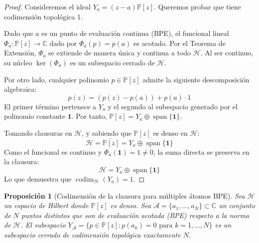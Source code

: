 \documentclass[12pt,a4paper]{article}
\newtheorem{proposition}{Proposición}
\theoremstyle{definition}
\theoremstyle{remark}
\newcommand{\Poly}{\mathbb{P}[z]}
\begin{document}
\begin{proof}
	Consideremos el ideal $Y_a = (z-a)\Poly$. Queremos probar que tiene codimensión topológica 1.

	Dado que $a$ es un punto de evaluación continua (BPE), el funcional lineal $\Phi_a: \Poly \to \mathbb{C}$ dado por $\Phi_a(p) = p(a)$ es acotado. Por el Teorema de Extensión, $\Phi_a$ se extiende de manera única y continua a todo $\mathcal{H}$. Al ser continuo, su núcleo $\ker(\Phi_a)$ es un subespacio cerrado de $\mathcal{H}$.

	Por otro lado, cualquier polinomio $p \in \Poly$ admite la siguiente descomposición algebraica:
	$$p(z) = (p(z) - p(a)) + p(a) \cdot 1$$
	El primer término pertenece a $Y_a$ y el segundo al subespacio generado por el polinomio constante $\mathbf{1}$. Por tanto, $\Poly = Y_a \oplus \operatorname{span}\{\mathbf{1}\}$.

	Tomando clausuras en $\mathcal{H}$, y sabiendo que $\Poly$ es denso en $\mathcal{H}$:
	$$\mathcal{H} = \overline{\Poly} = \overline{Y_a \oplus \operatorname{span}\{\mathbf{1}\}}$$
	Como el funcional es continuo y $\Phi_a(\mathbf{1}) = 1 \neq 0$, la suma directa se preserva en la clausura:
	$$\mathcal{H} = Y_a \oplus \operatorname{span}\{\mathbf{1}\}$$
	Lo que demuestra que $\operatorname{codim}_{\mathcal{H}}(Y_a) = 1$.
\end{proof}

\begin{proposition}[Codimensión de la clausura para múltiples átomos BPE]
	Sea $\mathcal{H}$ un espacio de Hilbert donde $\mathbb{P}[z]$ es denso. Sea $\mathcal{A} = \{a_1, \dots, a_N\} \subset \mathbb{C}$ un conjunto de $N$ puntos distintos que son de evaluación acotada (BPE) respecto a la norma de $\mathcal{H}$. El subespacio $Y_{\mathcal{A}} = \{p \in \mathbb{P}[z] : p(a_k) = 0 \text{ para } k=1,\dots,N\}$ es un subespacio cerrado de codimensión topológica exactamente $N$.
\end{proposition}
\end{document}
